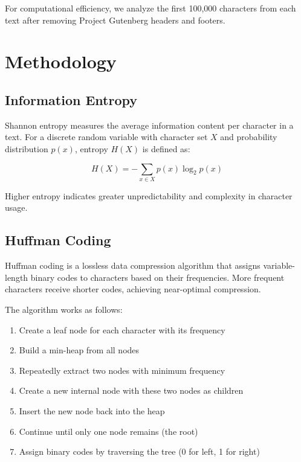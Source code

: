 \documentclass[11pt,a4paper]{article}
\begin{document}
For computational efficiency, we analyze the first 100,000 characters from each text after removing Project Gutenberg headers and footers.

\section{Methodology}

\subsection{Information Entropy}

Shannon entropy measures the average information content per character in a text. For a discrete random variable with character set $X$ and probability distribution $p(x)$, entropy $H(X)$ is defined as:

\begin{equation}
H(X) = -\sum_{x \in X} p(x) \log_2 p(x)
\end{equation}

Higher entropy indicates greater unpredictability and complexity in character usage.

\subsection{Huffman Coding}

Huffman coding is a lossless data compression algorithm that assigns variable-length binary codes to characters based on their frequencies. More frequent characters receive shorter codes, achieving near-optimal compression.

The algorithm works as follows:

\begin{enumerate}
    \item Create a leaf node for each character with its frequency
    \item Build a min-heap from all nodes
    \item Repeatedly extract two nodes with minimum frequency
    \item Create a new internal node with these two nodes as children
    \item Insert the new node back into the heap
    \item Continue until only one node remains (the root)
    \item Assign binary codes by traversing the tree (0 for left, 1 for right)
\end{enumerate}
\end{document}
